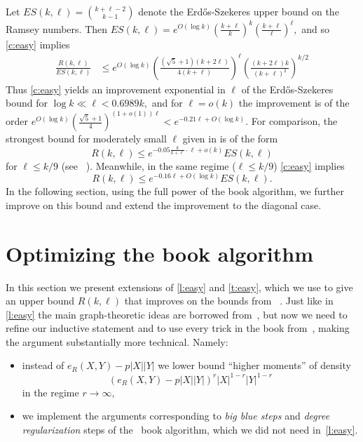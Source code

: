 \documentclass[reqno,final,12pt]{amsart}
\newcommand{\fs}[2]{\left(\frac{#1}{#2}\right)}
\begin{document}
Let $ES(k,\ell)=\binom{k+\ell-2}{k-1}$ denote the Erd\H{o}s-Szekeres upper bound on the Ramsey numbers. Then $ES(k,\ell)=e^{O(\log k)}\fs{k+\ell}{k}^{k}\fs{k+\ell}{\ell}^{\ell},$  and so \cref{c:easy} implies
\begin{align*} \frac{R(k,\ell)}{ES(k,\ell)} &\leq e^{O(\log k)}\fs{(\sqrt{5}+1)(k+2\ell)}{4(k+\ell)}^{\ell}\fs{(k+2\ell)k}{(k+\ell)^2}^{k/2} 
\end{align*}
Thus \cref{c:easy} yields an improvement  exponential in  $\ell$ of the Erd\H{o}s-Szekeres bound for  $\log k \ll \ell < 0.6989k,$ and for $\ell=o(k)$ the improvement is of the order $e^{O(\log k)}\fs{\sqrt{5}+1}{4}^{(1+o(1))\ell} < e^{-0.21\ell + 	 O(\log k)}$.
For comparison, the strongest bound for moderately small $\ell$ given in \cite{CGMS23} is of the form $$R(k,\ell) \leq e^{-0.05\frac{k}{k+\ell}\cdot\ell+o(k)}ES(k,\ell)$$
for $\ell \leq k/9$ (see ~\cite[Theorem 9.1]{CGMS23}).
Meanwhile, in the same regime ($\ell \leq k/9$) \cref{c:easy} implies 
$$R(k,\ell) \leq e^{-0.16\ell+ O(\log k)}ES(k,\ell).$$
In the following section, using the full power of the book algorithm, we further improve on this bound and extend the improvement to the diagonal case.

\section{Optimizing the book algorithm}\label{s:book}	

In this section we present extensions of \cref{l:easy} and \cref{t:easy},  which we use to give an upper bound $R(k,\ell)$ that improves on the bounds from ~\cite{CGMS23}. Just like in \cref{l:easy} the main graph-theoretic ideas are borrowed from~\cite{CGMS23}, but now we need to refine our inductive statement and to use every trick in the book from~\cite{CGMS23}, making the argument substantially more technical. Namely:
\begin{itemize}
	\item instead of $e_R(X,Y) - p|X||Y|$ we lower bound ``higher moments'' of density $$(e_R(X,Y) - p|X||Y|)^r|X|^{1-r}|Y|^{1-r}$$ in the regime $r \to \infty$,
	\item we implement the arguments corresponding to \emph{big blue steps} and \emph{degree regularization} steps of the~\cite{CGMS23} book algorithm, which we did not need in~\cref{l:easy}.  
\end{itemize}	
\end{document}

